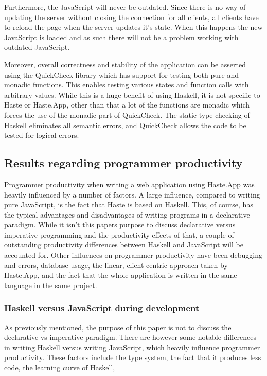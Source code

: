 \documentclass[a4paper]{article}
\begin{document}
Furthermore, the JavaScript will never be outdated. Since there is no way of updating the server without closing the connection for all clients, all clients have to reload the page when the server updates it's state. When this happens the new JavaScript is loaded and as such there will not be a problem working with outdated JavaScript.

Moreover, overall correctness and stability of the application can be asserted using the QuickCheck library which has support for testing both pure and monadic functions. This enables testing various states and function calls with arbitrary values. While this is a huge benefit of using Haskell, it is not specific to Haste or Haste.App, other than that a lot of the functions are monadic which forces the use of the monadic part of QuickCheck. The static type checking of Haskell eliminates all semantic errors, and QuickCheck allows the code to be tested for logical errors. 



\subsection{Results regarding programmer productivity}
Programmer productivity when writing a web application using Haste.App was heavily influenced by a number of factors. A large influence, compared to writing pure JavaScript, is the fact that Haste is based on Haskell. This, of course, has the typical advantages and disadvantages of writing programs in a declarative paradigm. While it isn't this papers purpose to discuss declarative versus imperative programming and the productivity effects of that, a couple of outstanding productivity differences between Haskell and JavaScript will be accounted for. Other influences on programmer productivity have been debugging and errors, database usage, the linear, client centric approach taken by Haste.App, and the fact that the whole application is written in the same language in the same project. 


\subsubsection{Haskell versus JavaScript during development}
As previously mentioned, the purpose of this paper is not to discuss the declarative vs imperative paradigm. There are however some notable differences in writing Haskell versus writing JavaScript, which heavily influence programmer productivity. These factors include the type system, the fact that it produces less code, the learning curve of Haskell, 
\end{document}
